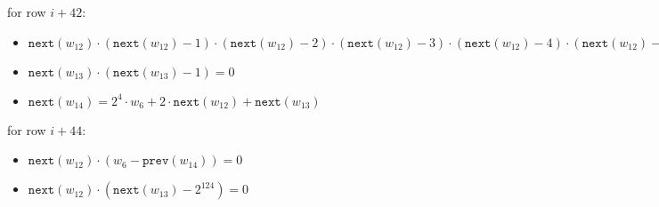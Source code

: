 for row $i+42$:
\begin{itemize}
    \item $\texttt{next}(w_{12}) \cdot (\texttt{next}(w_{12}) - 1) \cdot (\texttt{next}(w_{12}) - 2) \cdot (\texttt{next}(w_{12}) - 3) \cdot (\texttt{next}(w_{12}) - 4) \cdot (\texttt{next}(w_{12}) - 5) \cdot (\texttt{next}(w_{12}) - 6) \cdot (\texttt{next}(w_{12}) - 7)= 0$
    \item $\texttt{next}(w_{13}) \cdot (\texttt{next}(w_{13}) - 1) = 0$
    \item $\texttt{next}(w_{14}) = 2^4\cdot w_6 + 2 \cdot \texttt{next}(w_{12}) + \texttt{next}(w_{13})$
\end{itemize}

for row $i+44$:
\begin{itemize}
    \item $\texttt{next}(w_{12}) \cdot (w_6-\texttt{prev}(w_{14})) = 0$
    \item $\texttt{next}(w_{12}) \cdot (\texttt{next}(w_{13}) -2^{124}) = 0$
\end{itemize}


